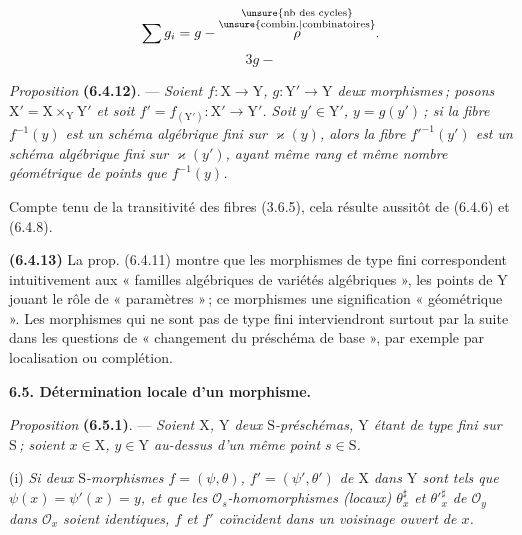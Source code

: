 \margin{[tout cycle est formé \unsure{exclusivemt|exclusivement} de courbes rationnelles, et \deleted{\unsure{est de longueur}} \inserted{\unsure{un cycle}} minimum est de longueur \unsure{au|n}}%
\[
\sum g_i=g-\overset{\substack{\text{\unsure{nb des cycles}}\\\text{\unsure{combin.|combinatoires}}}}{\rho}.
\]
\[
3g-
\]

\textit{Proposition} \textbf{(6.4.12)}. --- \textit{Soient $f:\mathrm{X}\to \mathrm{Y}$, $g:\mathrm{Y}'\to \mathrm{Y}$ deux morphismes\,; posons $\mathrm{X}'=\mathrm{X}\times_{\mathrm{Y}}\mathrm{Y}'$ et soit $f'=f_{(\mathrm{Y}')}:\mathrm{X}'\to \mathrm{Y}'$. Soit $y'\in \mathrm{Y}'$, $y=g(y')$\,; si la fibre $f^{-1}(y)$ est un schéma algébrique fini sur $\varkappa(y)$, alors la fibre ${f'}^{-1}(y')$ est un schéma algébrique fini sur $\varkappa(y')$, ayant même rang et même nombre géométrique de points que $f^{-1}(y)$.}

Compte tenu de la transitivité des fibres (3.6.5), cela résulte aussitôt de (6.4.6) et (6.4.8).

\textbf{(6.4.13)} La prop. (6.4.11) montre que les morphismes de type fini correspondent intuitivement aux « familles algébriques de variétés algébriques », les points de $\mathrm{Y}$ jouant le rôle de « paramètres »\,; ce   morphismes  une signification « géométrique ». \margin{\handwritten{$\times$}} Les morphismes qui ne sont pas de type fini interviendront surtout par la suite dans les questions de « changement du préschéma de base », par exemple par localisation ou complétion.

\textbf{6.5. Détermination locale d’un morphisme.}

\textit{Proposition} \textbf{(6.5.1)}. --- \textit{Soient $\mathrm{X}$, $\mathrm{Y}$ deux $\mathrm{S}$-préschémas, $\mathrm{Y}$ étant de type fini sur $\mathrm{S}$\,; soient $x\in \mathrm{X}$, $y\in \mathrm{Y}$ au-dessus d’un même point $s\in \mathrm{S}$.}

(i) \textit{Si deux $\mathrm{S}$-morphismes $f=(\psi,\theta)$, $f'=(\psi',\theta')$ de $\mathrm{X}$ dans $\mathrm{Y}$ sont tels que $\psi(x)=\psi'(x)=y$, et que les $\mathcal{O}_s$-homomorphismes (locaux) $\theta_x^{\sharp}$ et ${\theta'}^{\sharp}_x$ de $\mathcal{O}_y$ dans $\mathcal{O}_x$ soient identiques, $f$ et $f'$ coïncident dans un voisinage ouvert de $x$.}

